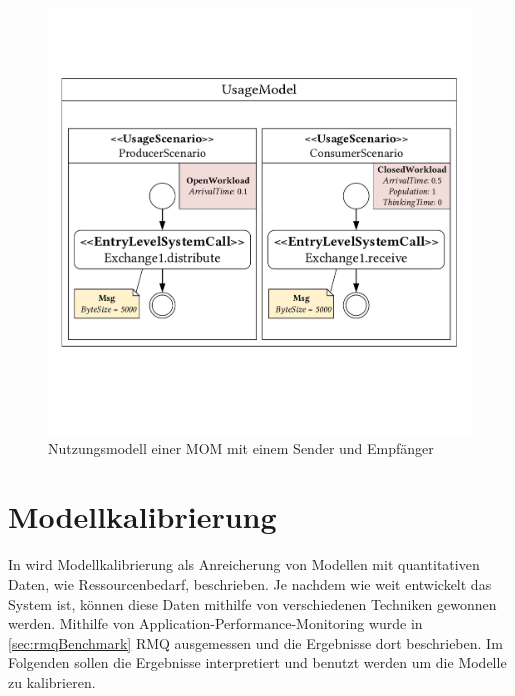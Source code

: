 \begin{figure}
\center
  \includegraphics[width=1\textwidth]{images/modelling/modelingUsage.pdf}
  \caption{Nutzungsmodell einer MOM mit einem Sender und Empfänger}
  \label{img:mom_usage}
\end{figure}

\section{Modellkalibrierung}
\label{sec:rmqRd}
In \cite{palladio17} wird Modellkalibrierung als Anreicherung von Modellen mit quantitativen Daten, wie Ressourcenbedarf, beschrieben. Je nachdem wie weit entwickelt das System ist, können diese Daten mithilfe von verschiedenen Techniken gewonnen werden. Mithilfe von Application-Performance-Monitoring wurde in \autoref{sec:rmqBenchmark} RMQ ausgemessen und die Ergebnisse dort beschrieben. Im Folgenden sollen die Ergebnisse interpretiert und benutzt werden um die Modelle zu kalibrieren.

